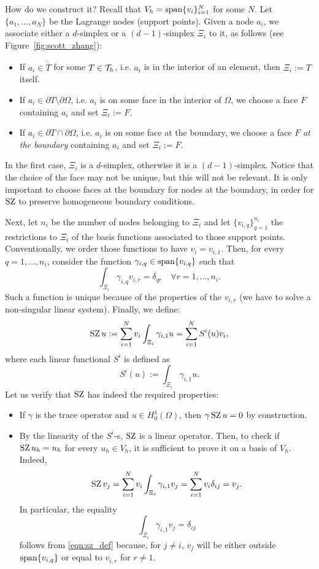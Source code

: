 How do we construct it? Recall that $V_h = \operatorname{span}\{v_i\}_{i=1}^N$ for some $N$. Let $\{a_1, \dots , a_N\}$ be the Lagrange nodes (support points).
Given a node $a_i$, we associate either a $d$-simplex or a $(d-1)$-simplex $\Xi_i$ to it, as follows (see Figure~\ref{fig:scott_zhang}):
\begin{itemize}
    \item If $a_i \in \mathring{\overline{T}}$ for some $T \in \mathcal{T}_h$, i.e. $a_i$ is in the interior of an element, then $\Xi_i := T$ itself.
    \item If $a_i \in \partial T \setminus \partial \Omega$, i.e. $a_i$ is on some face in the interior of $\Omega$, we choose a face $F$ containing $a_i$ and set $\Xi_i := F$.
    \item If $a_i \in \partial T \cap \partial \Omega$, i.e. $a_i$ is on some face at the boundary, we choose a face $F$ \emph{at the boundary} containing $a_i$ and set $\Xi_i := F$.
\end{itemize}
In the first case, $\Xi_i$ is a $d$-simplex, otherwise it is a $(d-1)$-simplex. Notice that the choice of the face may not be unique, but this will not be relevant. It is only important to choose faces at the boundary for nodes at the boundary, in order for $\operatorname{SZ}$ to preserve homogeneous boundary conditions.

Next, let $n_i$ be the number of nodes belonging to $\Xi_i$ and let $\{v_{i,q}\}_{q=1}^{n_i}$ the restrictions to $\Xi_i$ of the basis functions associated to those support points. Conventionally, we order those functions to have $v_i = v_{i,1}$. Then, for every $q=1,\dots,n_i$, consider the function $\gamma_{i,q} \in \operatorname{span}\{v_{i,q}\}$ such that
\begin{equation}\label{eqn:sz_def}
    \int_{\Xi_i} \gamma_{i,q} v_{i,r} = \delta_{qr} \quad \forall r=1,\dots,n_i.
\end{equation}
Such a function is unique because of the properties of the $v_{i,r}$ (we have to solve a non-singular linear system). Finally, we define:
\[
\operatorname{SZ} u := \sum_{i=1}^N v_i \int_{\Xi_i} \gamma_{i,1} u = 
\sum_{i=1}^N S^i(u) v_i,
\]
where each linear functional $S^i$ is defined as
\[
S^i(u) := \int_{\Xi_i} \gamma_{i,1} u.
\]
Let us verify that $\operatorname{SZ}$ has indeed the required properties:
\begin{itemize}
    \item If $\gamma$ is the trace operator and $u \in H^1_0(\Omega)$, then $\gamma \operatorname{SZ} u = 0$ by construction.
    \item By the linearity of the $S^i$-s, $\operatorname{SZ}$ is a linear operator. Then, to check if $\operatorname{SZ} u_h = u_h$ for every $u_h \in V_h$, it is sufficient to prove it on a basis of $V_h$. Indeed,
    \[
        \operatorname{SZ} v_j = \sum_{i=1}^N v_i \int_{\Xi_i} \gamma_{i,1} v_j = \sum_{i=1}^N v_i \delta_{ij} = v_j.
    \]
    In particular, the equality
    \[
    \int_{\Xi_i} \gamma_{i,1} v_j = \delta_{ij}
    \]
    follows from \eqref{eqn:sz_def} because, for $j \ne i$, $v_j$ will be either outside $\operatorname{span}\{v_{i,q}\}$ or equal to $v_{i,r}$ for $r \ne 1$.
\end{itemize}

